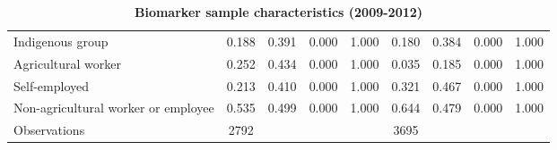 \begin{table}[h!]
\begin{center}
{{\begin{tabular}{l*{2}{cccc}}
Indigenous group    &       0.188&       0.391&       0.000&       1.000&       0.180&       0.384&       0.000&       1.000\\
Agricultural worker &       0.252&       0.434&       0.000&       1.000&       0.035&       0.185&       0.000&       1.000\\
Self-employed       &       0.213&       0.410&       0.000&       1.000&       0.321&       0.467&       0.000&       1.000\\
Non-agricultural worker or employee&       0.535&       0.499&       0.000&       1.000&       0.644&       0.479&       0.000&       1.000\\
\midrule
Observations        &        2792&            &            &            &        3695&            &            &            \\
\bottomrule
\end{tabular}%
}
}
\end{center}
\caption{\label{tab:Biomarker-sample-characteristics}\textbf{Biomarker sample characteristics
(2009-2012) }}
\end{table}  
  
  
  
  
  
  
  
  
  
  
  
  
  
  
  
  
  
  
  
  
  
  
  
  
  
  
  
  
  
  
  